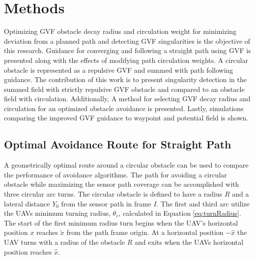 \documentclass[conf]{new-aiaa}
\begin{document}
%
%
%






\section{Methods}
Optimizing GVF obstacle decay radius and circulation weight for minimizing deviation from a planned path and detecting GVF singularities is the objective of this research. Guidance for converging and following a straight path using GVF is presented along with the effects of modifying path circulation weights. A circular obstacle is represented as a repulsive GVF and summed with path following guidance. The contribution of this work is to present singularity detection in the summed field with strictly repulsive GVF obstacle and compared to an obstacle field with circulation. Additionally, A method for selecting GVF decay radius and circulation for an optimized obstacle avoidance is presented. Lastly, simulations comparing the improved GVF guidance to waypoint and potential field is shown. 


\subsection{Optimal Avoidance Route for Straight Path}
A geometrically optimal route around a circular obstacle can be used to compare the performance of avoidance algorithms. The path for avoiding a circular obstacle while maximizing the sensor path coverage can be accomplished with three circular arc turns. The circular obstacle is defined to have a radius $R$ and a lateral distance $Y_0$ from the sensor path in frame $I$. The first and third arc utilize the UAVs minimum turning radius, $\theta_r$, calculated in Equation \ref{eq:turnRadius}. The start of the first minimum radius turn begins when the UAV's horizontal position $x$ reaches  $\tilde{x}$ from the path frame origin. At a horizontal position $-\hat{x}$ the UAV turns with a radius of the obstacle $R$ and exits when the UAVs horizontal position reaches $\hat{x}$. 
\end{document}
